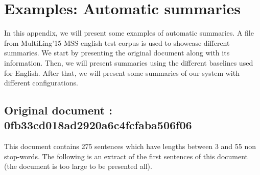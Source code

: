 \chapter{Examples: Automatic summaries}

In this appendix, we will present some examples of automatic summaries.
A file from MultiLing'15 MSS english test corpus is used to showcase different summaries. 
We start by presenting the original document along with its information.
Then, we will present summaries using the different baselines used for English.
After that, we will present some summaries of our system with different configurations.

\section{Original document : 0fb33cd018ad2920a6c4fcfaba506f06}

This document contains 275 sentences which have lengths between 3 and 55 non stop-words. 
The following is an extract of the first sentences of this document (the document is too large to be presented all).

